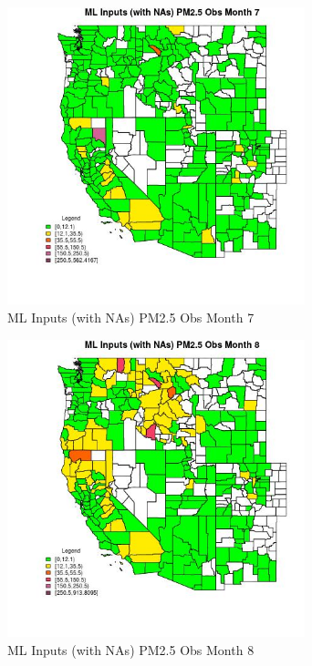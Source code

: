 \begin{figure} 
\centering  
\includegraphics[width=0.77\textwidth]{Code_Outputs/Report_ML_input_PM25_Step4_part_f_de_duplicated_aveswNAs_CountyPM25_ObsmedianMonth7.jpg} 
\caption{\label{fig:Report_ML_input_PM25_Step4_part_f_de_duplicated_aveswNAsCountyPM25_ObsmedianMonth7}ML Inputs (with NAs) PM2.5 Obs Month 7} 
\end{figure} 
 

\begin{figure} 
\centering  
\includegraphics[width=0.77\textwidth]{Code_Outputs/Report_ML_input_PM25_Step4_part_f_de_duplicated_aveswNAs_CountyPM25_ObsmedianMonth8.jpg} 
\caption{\label{fig:Report_ML_input_PM25_Step4_part_f_de_duplicated_aveswNAsCountyPM25_ObsmedianMonth8}ML Inputs (with NAs) PM2.5 Obs Month 8} 
\end{figure} 
 

